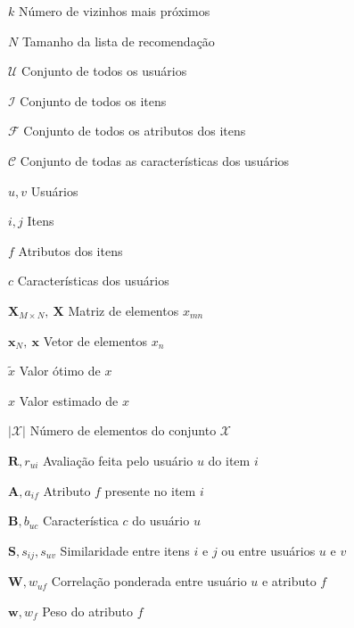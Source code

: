 \begin{simbolos}\label{simbolos}
    \item[$k$]  Número de vizinhos mais próximos 
    \item[$N$] Tamanho da lista de recomendação  
    \item[$\mathcal{U}$] Conjunto de todos os usuários 
    \item[$\mathcal{I}$] Conjunto de todos os itens  
    \item[$\mathcal{F}$] Conjunto  de todos os atributos dos itens
    \item[$\mathcal{C}$] Conjunto  de todas as características dos usuários
    \item[$u, v$] Usuários 
    \item[$i, j$] Itens 
    \item[$f$] Atributos dos itens 
    \item[$c $] Características dos usuários  
    \item[$\mathbf{X}_{M \times N},~\mathbf{X}$] Matriz de elementos $x_{mn}$ 
    \item[$\mathbf{x}_{N},~\mathbf{x}$] Vetor de elementos $x_{n}$
    \item[$\tilde{x}$] Valor ótimo de $x$
    \item[$\hat{x}$] Valor estimado de $x$
    \item[$|\mathcal{X}|$] Número de elementos do conjunto $\mathcal{X}$
    \item[$\mathbf{R}, r_{ui}$] Avaliação feita pelo usuário $u$ do item $i$
    \item[$\mathbf{A}, a_{if}$] Atributo $f$ presente no item $i$
    \item[$\mathbf{B}, b_{uc}$] Característica $c$ do usuário $u$   
    \item[$\mathbf{S}, s_{ij}, s_{uv}$] Similaridade entre itens $i$ e $j$ ou entre usuários $u$ e $v$
    \item[$\mathbf{W}, w_{uf}$] Correlação ponderada entre usuário $u$ e atributo $f$ 
    \item[$\mathbf{w}, w_{f}$] Peso do atributo $f$
\end{simbolos}
